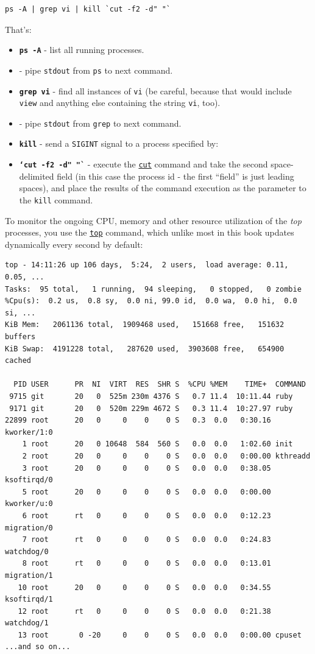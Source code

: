 \documentclass[10pt,]{book}
\numberwithin{figure}{chapter}
\begin{document}
\begin{verbatim}
ps -A | grep vi | kill `cut -f2 -d" "`
\end{verbatim}

That's:

\begin{itemize}
\item
  \textbf{\texttt{ps -A}} - list all running processes.
\item
  \textbf{\texttt{\textbar{}}} - pipe \texttt{stdout} from \texttt{ps}
  to next command.
\item
  \textbf{\texttt{grep vi}} - find all instances of \texttt{vi} (be
  careful, because that would include \texttt{view} and anything else
  containing the string \texttt{vi}, too).
\item
  \textbf{\texttt{\textbar{}}} - pipe \texttt{stdout} from \texttt{grep}
  to next command.
\item
  \textbf{\texttt{kill}} - send a \texttt{SIGINT} signal to a process
  specified by:
\item
  \textbf{\texttt{`cut -f2 -d" "`}} - execute the
  \href{http://linux.die.net/man/1/cut}{\texttt{cut}} command and take
  the second space-delimited field (in this case the process id - the
  first ``field'' is just leading spaces), and place the results of the
  command execution as the parameter to the \texttt{kill} command.
\end{itemize}

To monitor the ongoing CPU, memory and other resource utilization of the
\emph{top} processes, you use the
\href{http://linux.die.net/man/1/top}{\texttt{top}} command, which
unlike most in this book updates dynamically every second by default:

\begin{verbatim}
top - 14:11:26 up 106 days,  5:24,  2 users,  load average: 0.11, 0.05, ...
Tasks:  95 total,   1 running,  94 sleeping,   0 stopped,   0 zombie
%Cpu(s):  0.2 us,  0.8 sy,  0.0 ni, 99.0 id,  0.0 wa,  0.0 hi,  0.0 si, ...
KiB Mem:   2061136 total,  1909468 used,   151668 free,   151632 buffers
KiB Swap:  4191228 total,   287620 used,  3903608 free,   654900 cached

  PID USER      PR  NI  VIRT  RES  SHR S  %CPU %MEM    TIME+  COMMAND
 9715 git       20   0  525m 230m 4376 S   0.7 11.4  10:11.44 ruby
 9171 git       20   0  520m 229m 4672 S   0.3 11.4  10:27.97 ruby
22899 root      20   0     0    0    0 S   0.3  0.0   0:30.16 kworker/1:0
    1 root      20   0 10648  584  560 S   0.0  0.0   1:02.60 init
    2 root      20   0     0    0    0 S   0.0  0.0   0:00.00 kthreadd
    3 root      20   0     0    0    0 S   0.0  0.0   0:38.05 ksoftirqd/0
    5 root      20   0     0    0    0 S   0.0  0.0   0:00.00 kworker/u:0
    6 root      rt   0     0    0    0 S   0.0  0.0   0:12.23 migration/0
    7 root      rt   0     0    0    0 S   0.0  0.0   0:24.83 watchdog/0
    8 root      rt   0     0    0    0 S   0.0  0.0   0:13.01 migration/1
   10 root      20   0     0    0    0 S   0.0  0.0   0:34.55 ksoftirqd/1
   12 root      rt   0     0    0    0 S   0.0  0.0   0:21.38 watchdog/1
   13 root       0 -20     0    0    0 S   0.0  0.0   0:00.00 cpuset
...and so on...
\end{verbatim}
\end{document}
